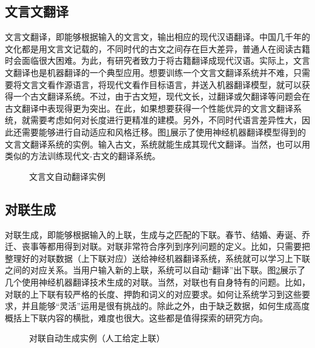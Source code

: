 \subsection{文言文翻译}

\parinterval 文言文翻译，即能够根据输入的文言文，输出相应的现代汉语翻译。中国几千年的文化都是用文言文记载的，不同时代的古文之间存在巨大差异，普通人在阅读古籍时会面临很大困难。为此，有研究者致力于将古籍翻译成现代汉语。实际上，文言文翻译也是机器翻译的一个典型应用。想要训练一个文言文翻译系统并不难，只需要将文言文看作源语言，将现代文看作目标语言，并送入机器翻译模型，就可以获得一个古文翻译系统。不过，由于古文短，现代文长，过翻译或欠翻译等问题会在古文翻译中表现得更为突出。在此，如果想要获得一个性能优异的文言文翻译系统，就需要考虑如何对长度进行更精准的建模。另外，不同时代语言差异性大，因此还需要能够进行自动适应和风格迁移。图\ref{fig:6-58}展示了使用神经机器翻译模型得到的文言文翻译系统的实例。输入古文，系统就能生成其现代文翻译。当然，也可以用类似的方法训练现代文-古文的翻译系统。

\begin{figure}[htp]
    \centering

   \caption{文言文自动翻译实例}
   \label{fig:6-58}
\end{figure}


\subsection{对联生成}

\parinterval 对联生成，即能够根据输入的上联，生成与之匹配的下联。春节、结婚、寿诞、乔迁、丧事等都用得到对联。对联非常符合序列到序列问题的定义。比如，只需要把整理好的对联数据（上下联对应）送给神经机器翻译系统，系统就可以学习上下联之间的对应关系。当用户输入新的上联，系统可以自动``翻译''出下联。图\ref{fig:6-59}展示了几个使用神经机器翻译技术生成的对联。当然，对联也有自身特有的问题。比如，对联的上下联有较严格的长度、押韵和词义的对应要求。如何让系统学习到这些要求，并且能够``灵活''运用是很有挑战的。除此之外，由于缺乏数据，如何生成高度概括上下联内容的横批，难度也很大。这些都是值得探索的研究方向。

\begin{figure}[htp]
    \centering

    \caption{对联自动生成实例（人工给定上联）}
    \label{fig:6-59}
\end{figure}

